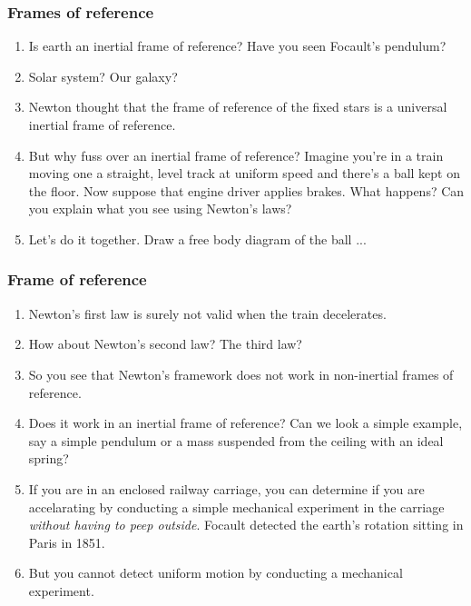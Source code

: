 \documentclass{beamer}
\begin{document}
\begin{frame}
\frametitle{Frames of reference}
\begin{enumerate}
\item Is earth an inertial frame of reference? Have you seen Focault's pendulum?
\item Solar system? Our galaxy?
\item Newton thought that the frame of reference of the fixed stars is a
universal inertial frame of reference.
\item But why fuss over an inertial frame of reference? Imagine you're in a
train moving one a straight, level track at uniform speed and there's a ball
kept on the floor. Now suppose that engine driver applies brakes. What happens?
Can you explain what you see using Newton's laws?
\item Let's do it together. Draw a free body diagram of the ball ...
\end{enumerate}
\end{frame}

\begin{frame}
\frametitle{Frame of reference}
\begin{enumerate}
\item Newton's first law is surely not valid when the train decelerates.
\item How about Newton's second law? The third law?
\item So you see that Newton's framework does not work in non-inertial frames
of reference.
\item Does it work in an inertial frame of reference? Can we look a simple
example, say a simple pendulum or a mass suspended from the ceiling with an
ideal spring? 
\item If you are in an enclosed railway carriage, you can determine if you are
accelarating by conducting a simple mechanical experiment in the carriage 
\emph{without having to peep outside}. Focault detected the earth's rotation 
sitting in Paris in 1851.
\item But you cannot detect uniform motion by conducting a mechanical 
experiment.
\end{enumerate}
\end{frame}
\end{document}
